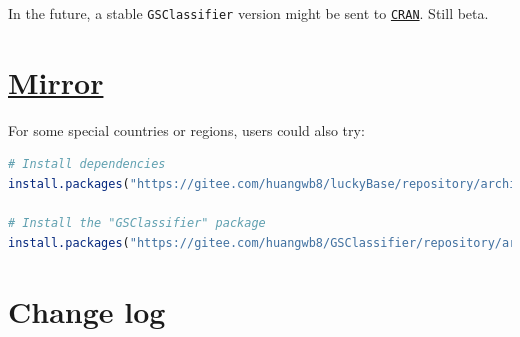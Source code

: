 \documentclass[
  12pt,
]{book}
\newcommand{\passthrough}[1]{#1}
\begin{document}
In the future, a stable \passthrough{\lstinline!GSClassifier!} version might be sent to \href{https://cran.r-project.org/}{\passthrough{\lstinline!CRAN!}}. Still beta.

\hypertarget{mirror}{%
\section*{\texorpdfstring{\href{https://gitee.com/huangwb8/GSClassifier}{Mirror}}{Mirror}}\label{mirror}}

For some special countries or regions, users could also try:

\begin{lstlisting}[language=R]
# Install dependencies
install.packages("https://gitee.com/huangwb8/luckyBase/repository/archive/Primary?format=tar.gz", repos=NULL, method="libcurl")

# Install the "GSClassifier" package
install.packages("https://gitee.com/huangwb8/GSClassifier/repository/archive/Primary?format=tar.gz", repos=NULL, method="libcurl")
\end{lstlisting}

\hypertarget{change-log}{%
\section*{Change log}\label{change-log}}
\end{document}
